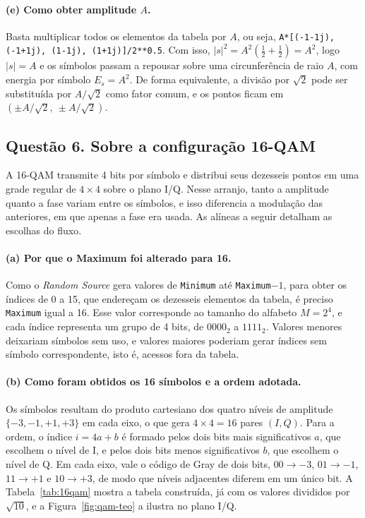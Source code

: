 \paragraph{(e) Como obter amplitude $A$.} Basta multiplicar todos os elementos da tabela por $A$, ou seja, \texttt{A*[(-1-1j), (-1+1j), (1-1j), (1+1j)]/2**0.5}. Com isso, $|s|^2=A^2\left(\tfrac12+\tfrac12\right)=A^2$, logo $|s|=A$ e os símbolos passam a repousar sobre uma circunferência de raio $A$, com energia por símbolo $E_s=A^2$. De forma equivalente, a divisão por $\sqrt2$ pode ser substituída por $A/\sqrt2$ como fator comum, e os pontos ficam em $(\pm A/\sqrt2,\ \pm A/\sqrt2)$.

\subsection*{Questão 6. Sobre a configuração 16-QAM}

A 16-QAM transmite 4 bits por símbolo e distribui seus dezesseis pontos em uma grade regular de $4\times4$ sobre o plano I/Q. Nesse arranjo, tanto a amplitude quanto a fase variam entre os símbolos, e isso diferencia a modulação das anteriores, em que apenas a fase era usada. As alíneas a seguir detalham as escolhas do fluxo.

\paragraph{(a) Por que o Maximum foi alterado para 16.} Como o \textit{Random Source} gera valores de \texttt{Minimum} até \texttt{Maximum}$-1$, para obter os índices de 0 a 15, que endereçam os dezesseis elementos da tabela, é preciso \texttt{Maximum} igual a 16. Esse valor corresponde ao tamanho do alfabeto $M=2^4$, e cada índice representa um grupo de 4 bits, de $0000_2$ a $1111_2$. Valores menores deixariam símbolos sem uso, e valores maiores poderiam gerar índices sem símbolo correspondente, isto é, acessos fora da tabela.

\paragraph{(b) Como foram obtidos os 16 símbolos e a ordem adotada.} Os símbolos resultam do produto cartesiano dos quatro níveis de amplitude $\{-3,-1,+1,+3\}$ em cada eixo, o que gera $4\times4=16$ pares $(I,Q)$. Para a ordem, o índice $i=4a+b$ é formado pelos dois bits mais significativos $a$, que escolhem o nível de I, e pelos dois bits menos significativos $b$, que escolhem o nível de Q. Em cada eixo, vale o código de Gray de dois bits, $00\to-3$, $01\to-1$, $11\to+1$ e $10\to+3$, de modo que níveis adjacentes diferem em um único bit. A Tabela~\ref{tab:16qam} mostra a tabela construída, já com os valores divididos por $\sqrt{10}$, e a Figura~\ref{fig:qam-teo} a ilustra no plano I/Q.

